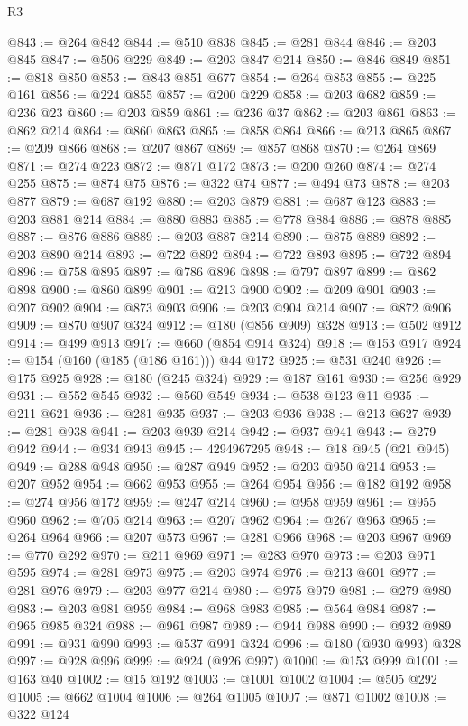 \begin{lexlean}{R3}
\begin{coremodule}
@843 := @264 @842
@844 := @510 @838
@845 := @281 @844
@846 := @203 @845
@847 := @506 @229
@849 := @203 @847 @214
@850 := @846 @849
@851 := @818 @850
@853 := @843 @851 @677
@854 := @264 @853
@855 := @225 @161
@856 := @224 @855
@857 := @200 @229
@858 := @203 @682
@859 := @236 @23
@860 := @203 @859
@861 := @236 @37
@862 := @203 @861
@863 := @862 @214
@864 := @860 @863
@865 := @858 @864
@866 := @213 @865
@867 := @209 @866
@868 := @207 @867
@869 := @857 @868
@870 := @264 @869
@871 := @274 @223
@872 := @871 @172
@873 := @200 @260
@874 := @274 @255
@875 := @874 @75
@876 := @322 @74
@877 := @494 @73
@878 := @203 @877
@879 := @687 @192
@880 := @203 @879
@881 := @687 @123
@883 := @203 @881 @214
@884 := @880 @883
@885 := @778 @884
@886 := @878 @885
@887 := @876 @886
@889 := @203 @887 @214
@890 := @875 @889
@892 := @203 @890 @214
@893 := @722 @892
@894 := @722 @893
@895 := @722 @894
@896 := @758 @895
@897 := @786 @896
@898 := @797 @897
@899 := @862 @898
@900 := @860 @899
@901 := @213 @900
@902 := @209 @901
@903 := @207 @902
@904 := @873 @903
@906 := @203 @904 @214
@907 := @872 @906
@909 := @870 @907 @324
@912 := @180 (@856 @909) @328
@913 := @502 @912
@914 := @499 @913
@917 := @660 (@854 @914 @324)
@918 := @153 @917
@924 := @154 (@160 (@185 (@186 @161))) @44 @172
@925 := @531 @240
@926 := @175 @925
@928 := @180 (@245 @324)
@929 := @187 @161
@930 := @256 @929
@931 := @552 @545
@932 := @560 @549
@934 := @538 @123 @11
@935 := @211 @621
@936 := @281 @935
@937 := @203 @936
@938 := @213 @627
@939 := @281 @938
@941 := @203 @939 @214
@942 := @937 @941
@943 := @279 @942
@944 := @934 @943
@945 := 4294967295
@948 := @18 @945 (@21 @945)
@949 := @288 @948
@950 := @287 @949
@952 := @203 @950 @214
@953 := @207 @952
@954 := @662 @953
@955 := @264 @954
@956 := @182 @192
@958 := @274 @956 @172
@959 := @247 @214
@960 := @958 @959
@961 := @955 @960
@962 := @705 @214
@963 := @207 @962
@964 := @267 @963
@965 := @264 @964
@966 := @207 @573
@967 := @281 @966
@968 := @203 @967
@969 := @770 @292
@970 := @211 @969
@971 := @283 @970
@973 := @203 @971 @595
@974 := @281 @973
@975 := @203 @974
@976 := @213 @601
@977 := @281 @976
@979 := @203 @977 @214
@980 := @975 @979
@981 := @279 @980
@983 := @203 @981 @959
@984 := @968 @983
@985 := @564 @984
@987 := @965 @985 @324
@988 := @961 @987
@989 := @944 @988
@990 := @932 @989
@991 := @931 @990
@993 := @537 @991 @324
@996 := @180 (@930 @993) @328
@997 := @928 @996
@999 := @924 (@926 @997)
@1000 := @153 @999
@1001 := @163 @40
@1002 := @15 @192
@1003 := @1001 @1002
@1004 := @505 @292
@1005 := @662 @1004
@1006 := @264 @1005
@1007 := @871 @1002
@1008 := @322 @124

\end{coremodule}
\end{lexlean}
